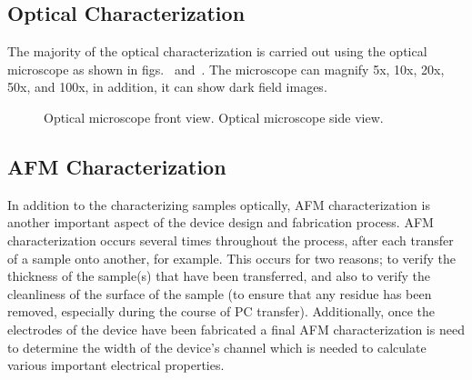 \subsection{Optical Characterization}\label{subsec:characterization_optical}
The majority of the optical characterization is carried out using the optical microscope as shown in figs.~ and~. The microscope can magnify 5x, 10x, 20x, 50x, and 100x, in addition, it can show dark field images.
\begin{figure}[ht]
	\centering
	\qquad
	\caption[Optical microscope]{\protect{} Optical microscope front view. \protect{} Optical microscope side view.}
\end{figure}

\subsection{AFM Characterization}\label{subsec:characterization_afm}
In addition to the characterizing samples optically, \acs{AFM} characterization is another important aspect of the device design and fabrication process. \acs{AFM} characterization occurs several times throughout the process, after each transfer of a sample onto another, for example. This occurs for two reasons; to verify the thickness of the sample(s) that have been transferred, and also to verify the cleanliness of the surface of the sample (to ensure that any residue has been removed, especially during the course of PC transfer). Additionally, once the electrodes of the device have been fabricated a final \acs{AFM} characterization is need to determine the width of the device's channel which is needed to calculate various important electrical properties. \\ \\

